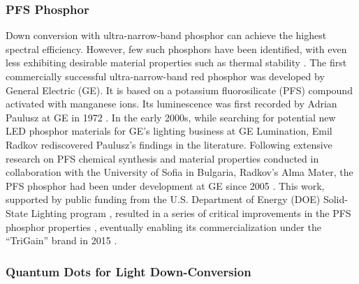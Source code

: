 \documentclass[parskip=full]{article}
\begin{document}
\subsubsection{PFS Phosphor}

Down conversion with ultra-narrow-band phosphor can achieve the highest spectral efficiency. However, few such phosphors have been identified, with even less exhibiting desirable material properties such as thermal stability \cite{Phillips2007}. The first commercially successful ultra-narrow-band red phosphor was developed by General Electric (GE). It is based on a potassium fluorosilicate (PFS) compound activated with manganese ions. Its luminescence was first recorded by Adrian Paulusz at GE in 1972 \cite{paulusz1973efficient}. In the early 2000s, while searching for potential new LED phosphor materials for GE’s lighting business at GE Lumination, Emil Radkov rediscovered Paulusz’s findings in the literature. Following extensive research on PFS chemical synthesis and material properties conducted in collaboration with the University of Sofia in Bulgaria, Radkov’s Alma Mater, the PFS phosphor had been under development at GE since 2005 \cite{radkov2006red}\cite{radkov2009red}. This work, supported by public funding from the U.S. Department of Energy (DOE) Solid-State Lighting program \cite{doesslprogram}, resulted in a series of critical improvements in the PFS phosphor properties \cite{Setlur2010}\cite{lyons2012color}, eventually enabling its commercialization under the “TriGain” brand in 2015 \cite{trigain_spectrum}\cite{setlur2015trigain}\cite{Murphy2015}.

\subsubsection{Quantum Dots for Light Down-Conversion}
\end{document}
